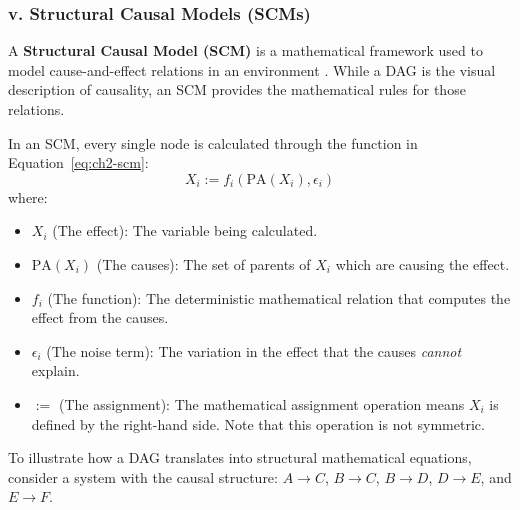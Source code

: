 \subsubsection*{v. Structural Causal Models (SCMs)}

A \textbf{Structural Causal Model (SCM)} is a mathematical framework used to model cause-and-effect relations in an environment \cite{neal2020}. While a DAG is the visual description of causality, an SCM provides the mathematical rules for those relations. 

In an SCM, every single node is calculated through the function in Equation~\eqref{eq:ch2-scm}:
\begin{equation}
    \label{eq:ch2-scm}
    X_i := f_i(\text{PA}(X_i), \epsilon_i)
\end{equation}
where: 
\begin{itemize}
    \item $X_i$ (The effect): The variable being calculated.
    \item $\text{PA}(X_i)$ (The causes): The set of parents of $X_i$ which are causing the effect.
    \item $f_i$ (The function): The deterministic mathematical relation that computes the effect from the causes.
    \item $\epsilon_i$ (The noise term): The variation in the effect that the causes \textit{cannot} explain.
    \item $:=$ (The assignment): The mathematical assignment operation means $X_i$ is defined by the right-hand side. Note that this operation is not symmetric. 
\end{itemize}

To illustrate how a DAG translates into structural mathematical equations, consider a system with the causal structure: $A \rightarrow C$, $B \rightarrow C$, $B \rightarrow D$, $D \rightarrow E$, and $E \rightarrow F$.

\begin{center}
\end{center} 

